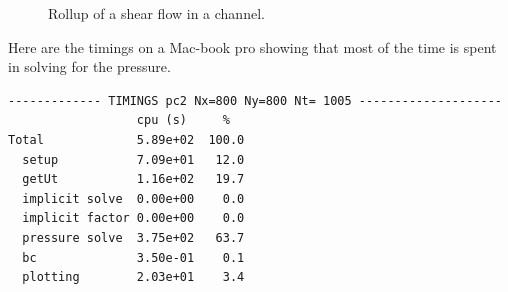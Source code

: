 {
\newcommand{\figSizeWide}{16cm}
\newcommand{\figSize}{9cm}
\newcommand{\figHeight}{4.5cm}

\begin{figure}[htb]
\begin{center}
\end{center}
\caption{Rollup of a shear flow in a channel.
    } 
\label{fig:shearFlow}
\end{figure}
}

\mni
Here are the timings on a Mac-book pro showing that most of the time is spent in solving for the pressure.
\begin{Verbatim}[fontsize=\small]
  ------------- TIMINGS pc2 Nx=800 Ny=800 Nt= 1005 --------------------
                  cpu (s)     %   
Total             5.89e+02  100.0
  setup           7.09e+01   12.0
  getUt           1.16e+02   19.7
  implicit solve  0.00e+00    0.0
  implicit factor 0.00e+00    0.0
  pressure solve  3.75e+02   63.7
  bc              3.50e-01    0.1
  plotting        2.03e+01    3.4
\end{Verbatim}
